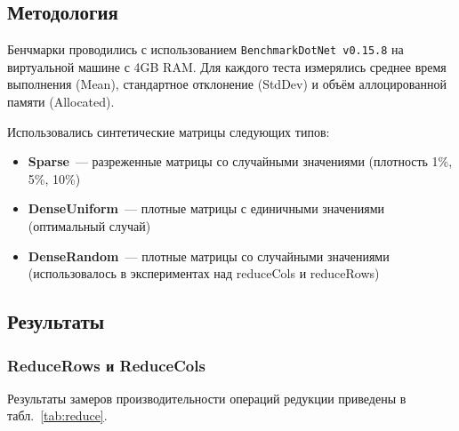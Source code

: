 \documentclass[a4paper]{article}
\begin{document}
\subsection{Методология}

Бенчмарки проводились с использованием \texttt{BenchmarkDotNet v0.15.8} на виртуальной машине с 4GB RAM. Для каждого теста измерялись среднее время выполнения (Mean), стандартное отклонение (StdDev) и объём аллоцированной памяти (Allocated).

Использовались синтетические матрицы следующих типов:
\begin{itemize}
    \item \textbf{Sparse}~--- разреженные матрицы со случайными значениями (плотность 1\%, 5\%, 10\%)
    \item \textbf{DenseUniform}~--- плотные матрицы с единичными значениями (оптимальный случай)
    \item \textbf{DenseRandom}~--- плотные матрицы со случайными значениями (использовалось в экспериментах над reduceCols и reduceRows)
\end{itemize}

\subsection{Результаты}

\subsubsection{ReduceRows и ReduceCols}

Результаты замеров производительности операций редукции приведены в табл.~\ref{tab:reduce}.
\end{document}
